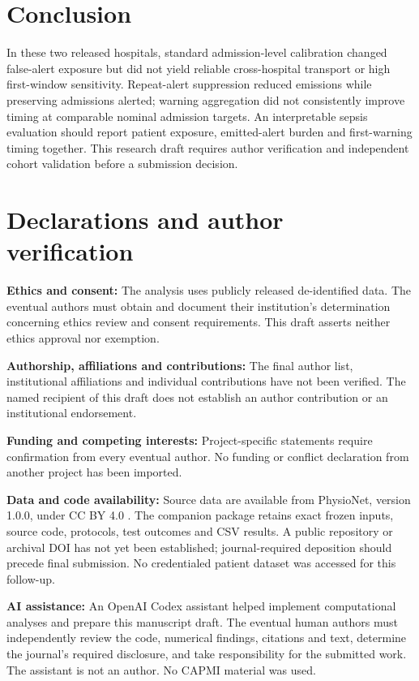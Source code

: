 \documentclass[11pt,a4paper]{article}
\begin{document}
\section{Conclusion}
In these two released hospitals, standard admission-level calibration changed false-alert exposure but did not yield reliable cross-hospital transport or high first-window sensitivity. Repeat-alert suppression reduced emissions while preserving admissions alerted; warning aggregation did not consistently improve timing at comparable nominal admission targets. An interpretable sepsis evaluation should report patient exposure, emitted-alert burden and first-warning timing together. This research draft requires author verification and independent cohort validation before a submission decision.

\section*{Declarations and author verification}
\textbf{Ethics and consent:} The analysis uses publicly released de-identified data. The eventual authors must obtain and document their institution's determination concerning ethics review and consent requirements. This draft asserts neither ethics approval nor exemption.

\textbf{Authorship, affiliations and contributions:} The final author list, institutional affiliations and individual contributions have not been verified. The named recipient of this draft does not establish an author contribution or an institutional endorsement.

\textbf{Funding and competing interests:} Project-specific statements require confirmation from every eventual author. No funding or conflict declaration from another project has been imported.

\textbf{Data and code availability:} Source data are available from PhysioNet, version 1.0.0, under CC BY 4.0 \cite{reynadata,pollard}. The companion package retains exact frozen inputs, source code, protocols, test outcomes and CSV results. A public repository or archival DOI has not yet been established; journal-required deposition should precede final submission. No credentialed patient dataset was accessed for this follow-up.

\textbf{AI assistance:} An OpenAI Codex assistant helped implement computational analyses and prepare this manuscript draft. The eventual human authors must independently review the code, numerical findings, citations and text, determine the journal's required disclosure, and take responsibility for the submitted work. The assistant is not an author. No CAPMI material was used.
\end{document}
